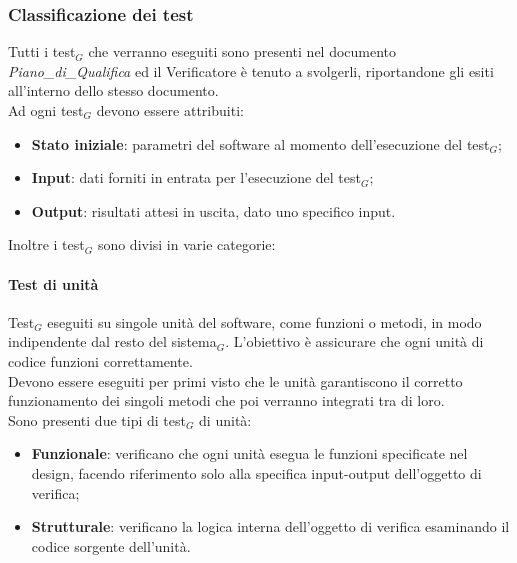 \documentclass[10pt]{article}
\begin{document}
\begin{justify}
    \subsubsection{Classificazione dei test}
    Tutti i test$_G$ che verranno eseguiti sono presenti nel documento \textit{Piano\_di\_Qualifica} ed il Verificatore è tenuto a svolgerli, riportandone gli esiti all'interno dello stesso documento.\\
    Ad ogni test$_G$ devono essere attribuiti:
    \begin{itemize}
    \item \textbf{Stato iniziale}: parametri del software al momento dell'esecuzione del test$_G$;
    \item \textbf{Input}: dati forniti in entrata per l'esecuzione del test$_G$;
    \item \textbf{Output}: risultati attesi in uscita, dato uno specifico input.
    \end{itemize}
    Inoltre i test$_G$ sono divisi in varie categorie:

    \paragraph{Test di unità}
    Test$_G$ eseguiti su singole unità del software, come funzioni o metodi, in modo indipendente dal resto del sistema$_G$. L'obiettivo è assicurare che ogni unità di codice funzioni correttamente.\\
    Devono essere eseguiti per primi visto che le unità garantiscono il corretto funzionamento dei singoli metodi che poi verranno integrati tra di loro.\\
    Sono presenti due tipi di test$_G$ di unità:
    \begin{itemize}
    \item \textbf{Funzionale}: verificano che ogni unità esegua le funzioni specificate nel design, facendo riferimento solo alla specifica input-output dell'oggetto di verifica;
    \item \textbf{Strutturale}: verificano la logica interna dell'oggetto di verifica esaminando il codice sorgente dell'unità.
    \end{itemize}


\end{justify}
\end{document}
